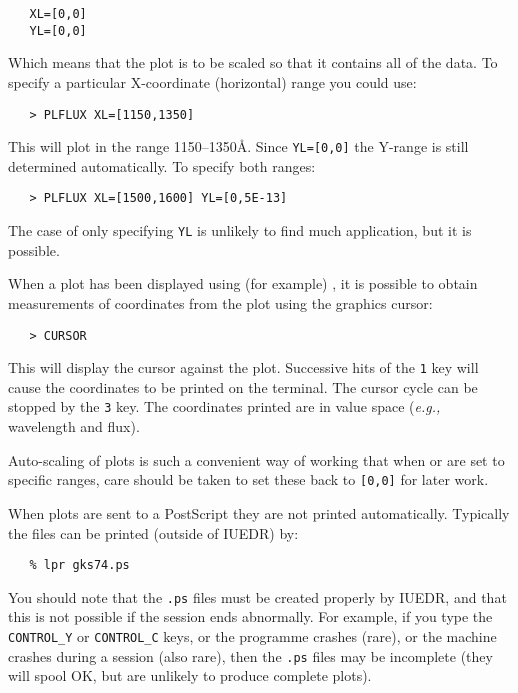 \begin{verbatim}
   XL=[0,0]
   YL=[0,0]
\end{verbatim}

Which means that the plot is to be scaled so that it contains all of the
data.  To specify a particular X-coordinate (horizontal) range you could use:

\begin{verbatim}
   > PLFLUX XL=[1150,1350]
\end{verbatim}

This will plot in the range 1150--1350\AA\@.  Since \verb+YL=[0,0]+ the
Y-range is still determined automatically.  To specify both ranges:

\begin{verbatim}
   > PLFLUX XL=[1500,1600] YL=[0,5E-13]
\end{verbatim}

The case of only specifying \verb+YL+ is unlikely to find much application,
but it is possible.

When a plot has been displayed using (for example)
, it is
possible to obtain measurements of coordinates from the plot using the
graphics cursor:

\begin{verbatim}
   > CURSOR
\end{verbatim}

This will display the cursor against the plot.  Successive hits of the \verb+1+
key will cause the coordinates to be printed on the terminal.  The cursor cycle
can be stopped by the \verb+3+ key.  The coordinates printed are in value space
({\it{e.g.,}} wavelength and flux)\@.

Auto-scaling of plots is such a convenient way of working that when
 or
 are set to specific ranges, care should be taken to set these back to
\verb+[0,0]+ for later work.

When plots are sent to a PostScript 
 they are not printed
automatically.  Typically the files can be printed (outside of IUEDR)
by:

\begin{verbatim}
   % lpr gks74.ps
\end{verbatim}

You should note that the \verb+.ps+ files must be created properly by IUEDR,
and that this is not possible if the session ends abnormally.  For example, if
you type the \verb+CONTROL_Y+ or
\verb+CONTROL_C+ keys, or the programme crashes (rare), or
the machine crashes during a session (also rare), then the \verb+.ps+ files
may be incomplete (they will spool OK, but are unlikely to produce complete
plots)\@.


